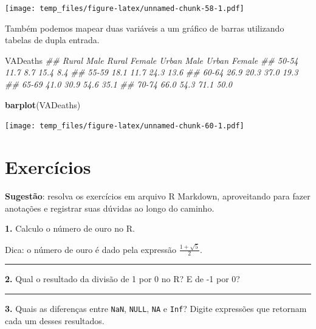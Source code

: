 \documentclass[
]{book}
\newenvironment{Shaded}{\begin{snugshade}}{\end{snugshade}}
\newcommand{\CommentTok}[1]{\textcolor[rgb]{0.56,0.35,0.01}{\textit{#1}}}
\newcommand{\KeywordTok}[1]{\textcolor[rgb]{0.13,0.29,0.53}{\textbf{#1}}}
\newcommand{\NormalTok}[1]{#1}
\begin{document}
\texttt{[image: temp\_files/figure-latex/unnamed-chunk-58-1.pdf]}

Também podemos mapear duas variáveis a um gráfico de barras utilizando tabelas de dupla entrada.

\begin{Shaded}
\begin{Highlighting}[]
\NormalTok{VADeaths}
\CommentTok{##       Rural Male Rural Female Urban Male Urban Female}
\CommentTok{## 50-54       11.7          8.7       15.4          8.4}
\CommentTok{## 55-59       18.1         11.7       24.3         13.6}
\CommentTok{## 60-64       26.9         20.3       37.0         19.3}
\CommentTok{## 65-69       41.0         30.9       54.6         35.1}
\CommentTok{## 70-74       66.0         54.3       71.1         50.0}
\end{Highlighting}
\end{Shaded}

\begin{Shaded}
\begin{Highlighting}[]
\KeywordTok{barplot}\NormalTok{(VADeaths)}
\end{Highlighting}
\end{Shaded}

\texttt{[image: temp\_files/figure-latex/unnamed-chunk-60-1.pdf]}

\hypertarget{exercuxedcios}{%
\section{Exercícios}\label{exercuxedcios}}

\textbf{Sugestão}: resolva os exercícios em arquivo R Markdown, aproveitando para fazer anotações e registrar suas dúvidas ao longo do caminho.

\textbf{1.} Calculo o número de ouro no R.

Dica: o número de ouro é dado pela expressão \(\frac{1 + \sqrt{5}}{2}\).

\begin{center}\rule{0.5\linewidth}{0.5pt}\end{center}

\textbf{2.} Qual o resultado da divisão de 1 por 0 no R? E de -1 por 0?

\begin{center}\rule{0.5\linewidth}{0.5pt}\end{center}

\textbf{3.} Quais as diferenças entre \texttt{NaN}, \texttt{NULL}, \texttt{NA} e \texttt{Inf}? Digite expressões que retornam cada um desses resultados.
\end{document}
